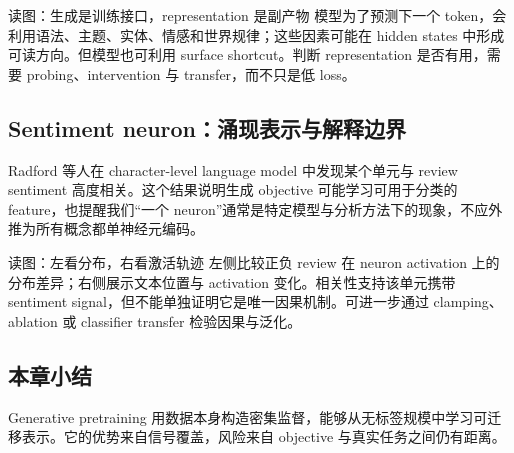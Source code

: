 
\begin{knowledgebox}{读图：生成是训练接口，representation 是副产物}
模型为了预测下一个 token，会利用语法、主题、实体、情感和世界规律；这些因素可能在 hidden states 中形成可读方向。但模型也可利用 surface shortcut。判断 representation 是否有用，需要 probing、intervention 与 transfer，而不只是低 loss。
\end{knowledgebox}

\subsection{Sentiment neuron：涌现表示与解释边界}

Radford 等人在 character-level language model 中发现某个单元与 review sentiment 高度相关。这个结果说明生成 objective 可能学习可用于分类的 feature，也提醒我们“一个 neuron”通常是特定模型与分析方法下的现象，不应外推为所有概念都单神经元编码。


\begin{knowledgebox}{读图：左看分布，右看激活轨迹}
左侧比较正负 review 在 neuron activation 上的分布差异；右侧展示文本位置与 activation 变化。相关性支持该单元携带 sentiment signal，但不能单独证明它是唯一因果机制。可进一步通过 clamping、ablation 或 classifier transfer 检验因果与泛化。
\end{knowledgebox}


\subsection{本章小结}

Generative pretraining 用数据本身构造密集监督，能够从无标签规模中学习可迁移表示。它的优势来自信号覆盖，风险来自 objective 与真实任务之间仍有距离。

